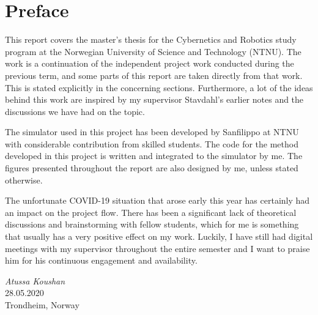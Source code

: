 \chapter{Preface}

This report covers the master's thesis for the Cybernetics and Robotics study program at the Norwegian University of Science and Technology (NTNU). The work is a continuation of the independent project work conducted during the previous term, and some parts of this report are taken directly from that work. This is stated explicitly in the concerning sections. Furthermore, a lot of the ideas behind this work are inspired by my supervisor Stavdahl's earlier notes and the discussions we have had on the topic.

The simulator used in this project has been developed by Sanfilippo at NTNU with considerable contribution from skilled students. The code for the method developed in this project is written and integrated to the simulator by me. The figures presented throughout the report are also designed by me, unless stated otherwise.

The unfortunate COVID-19 situation that arose early this year has certainly had an impact on the project flow.  %
There has been a significant lack of theoretical discussions and brainstorming with fellow students, which for me is something that usually has a very positive effect on my work. Luckily, I have still had digital meetings with my supervisor throughout the entire semester  
and I want to praise him for his continuous engagement and availability.


\medskip
\begin {flushright}
  \textit{Atussa Koushan} \\
  \textsc {28.05.2020} \\
  Trondheim, Norway
\end {flushright}



\makeatletter
{}


\makeatother




